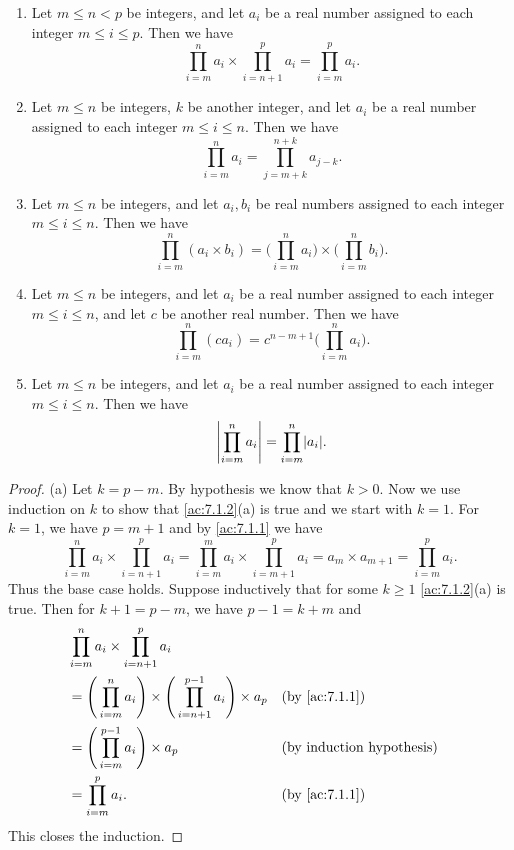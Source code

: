\begin{ac}\label{ac:7.1.2}
  \mbox{}
  \begin{enumerate}
    \item Let \(m \leq n < p\) be integers, and let \(a_i\) be a real number assigned to each integer \(m \leq i \leq p\).
          Then we have
          \[
            \prod_{i = m}^n a_i \times \prod_{i = n + 1}^p a_i = \prod_{i = m}^p a_i.
          \]
    \item Let \(m \leq n\) be integers, \(k\) be another integer, and let \(a_i\) be a real number assigned to each integer \(m \leq i \leq n\).
          Then we have
          \[
            \prod_{i = m}^n a_i = \prod_{j = m + k}^{n + k} a_{j - k}.
          \]
    \item Let \(m \leq n\) be integers, and let \(a_i, b_i\) be real numbers assigned to each integer \(m \leq i \leq n\).
          Then we have
          \[
            \prod_{i = m}^n (a_i \times b_i) = \Bigg(\prod_{i = m}^n a_i\Bigg) \times \Bigg(\prod_{i = m}^n b_i\Bigg).
          \]
    \item Let \(m \leq n\) be integers, and let \(a_i\) be a real number assigned to each integer \(m \leq i \leq n\), and let \(c\) be another real number.
          Then we have
          \[
            \prod_{i = m}^n (ca_i) = c^{n - m + 1} \Bigg(\prod_{i = m}^n a_i\Bigg).
          \]
    \item Let \(m \leq n\) be integers, and let \(a_i\) be a real number assigned to each integer \(m \leq i \leq n\).
          Then we have
          \[
            \abs{\prod_{i = m}^n a_i} = \prod_{i = m}^n \abs{a_i}.
          \]
  \end{enumerate}
\end{ac}

\begin{proof}{(a)}
  Let \(k = p - m\).
  By hypothesis we know that \(k > 0\).
  Now we use induction on \(k\) to show that \cref{ac:7.1.2}(a) is true and we start with \(k = 1\).
  For \(k = 1\), we have \(p = m + 1\) and by \cref{ac:7.1.1} we have
  \[
    \prod_{i = m}^n a_i \times \prod_{i = n + 1}^p a_i = \prod_{i = m}^m a_i \times \prod_{i = m + 1}^p a_i = a_m \times a_{m + 1} = \prod_{i = m}^p a_i.
  \]
  Thus the base case holds.
  Suppose inductively that for some \(k \geq 1\) \cref{ac:7.1.2}(a) is true.
  Then for \(k + 1 = p - m\), we have \(p - 1 = k + m\) and
  \begin{align*}
     & \prod_{i = m}^n a_i \times \prod_{i = n + 1}^p a_i                                                               \\
     & = \Bigg(\prod_{i = m}^n a_i\Bigg) \times \Bigg(\prod_{i = n + 1}^{p - 1} a_i\Bigg) \times a_p &  & \by{ac:7.1.1} \\
     & = \Bigg(\prod_{i = m}^{p - 1} a_i\Bigg) \times a_p                                            &  & \byIH         \\
     & = \prod_{i = m}^p a_i.                                                                        &  & \by{ac:7.1.1}
  \end{align*}
  This closes the induction.
\end{proof}

